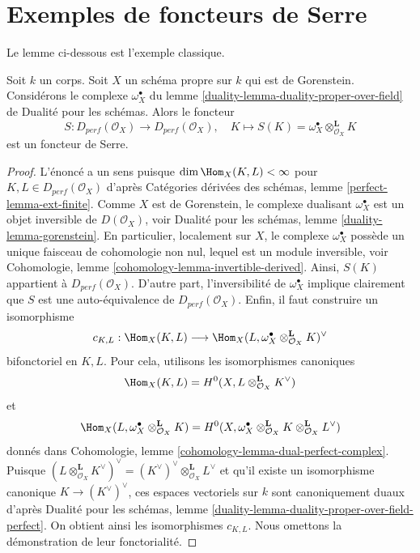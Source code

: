 \section{Exemples de foncteurs de Serre}
\label{section-examples-Serre-functors}

\noindent
Le lemme ci-dessous est l'exemple classique.

\begin{lemma}
\label{lemma-Serre-functor-Gorenstein-proper}
Soit $k$ un corps. Soit $X$ un schéma propre sur $k$ qui est de Gorenstein.
Considérons le complexe $\omega_X^\bullet$ du
lemme \ref{duality-lemma-duality-proper-over-field} de Dualité pour les schémas.
Alors le foncteur
$$
S : D_{perf}(\mathcal{O}_X) \longrightarrow D_{perf}(\mathcal{O}_X),\quad
K \longmapsto S(K) = \omega_X^\bullet \otimes_{\mathcal{O}_X}^\mathbf{L} K
$$
est un foncteur de Serre.
\end{lemma}

\begin{proof}
L'énoncé a un sens puisque $\dim \Hom_X(K, L) < \infty$
pour $K, L \in D_{perf}(\mathcal{O}_X)$ d'après
Catégories dérivées des schémas, lemme \ref{perfect-lemma-ext-finite}.
Comme $X$ est de Gorenstein, le complexe dualisant $\omega_X^\bullet$
est un objet inversible de $D(\mathcal{O}_X)$, voir
Dualité pour les schémas, lemme \ref{duality-lemma-gorenstein}.
En particulier, localement sur $X$, le complexe $\omega_X^\bullet$
possède un unique faisceau de cohomologie non nul, lequel est un module inversible, voir
Cohomologie, lemme \ref{cohomology-lemma-invertible-derived}.
Ainsi, $S(K)$ appartient à $D_{perf}(\mathcal{O}_X)$.
D'autre part, l'inversibilité de $\omega_X^\bullet$
implique clairement que $S$ est une auto-équivalence de $D_{perf}(\mathcal{O}_X)$.
Enfin, il faut construire un isomorphisme
$$
c_{K, L} : \Hom_X(K, L) \longrightarrow
\Hom_X(L, \omega_X^\bullet \otimes_{\mathcal{O}_X}^\mathbf{L} K)^\vee
$$
bifonctoriel en $K, L$. Pour cela, utilisons les isomorphismes canoniques
$$
\Hom_X(K, L) = H^0(X, L \otimes_{\mathcal{O}_X}^\mathbf{L} K^\vee)
$$
et
$$
\Hom_X(L, \omega_X^\bullet \otimes_{\mathcal{O}_X}^\mathbf{L} K) =
H^0(X, 
\omega_X^\bullet \otimes_{\mathcal{O}_X}^\mathbf{L} K
\otimes_{\mathcal{O}_X}^\mathbf{L} L^\vee)
$$
donnés dans Cohomologie, lemme \ref{cohomology-lemma-dual-perfect-complex}.
Puisque $(L \otimes_{\mathcal{O}_X}^\mathbf{L} K^\vee)^\vee =
(K^\vee)^\vee \otimes_{\mathcal{O}_X}^\mathbf{L} L^\vee$
et qu'il existe un isomorphisme canonique $K \to (K^\vee)^\vee$,
ces espaces vectoriels sur $k$ sont canoniquement duaux d'après
Dualité pour les schémas, lemme
\ref{duality-lemma-duality-proper-over-field-perfect}.
On obtient ainsi les isomorphismes $c_{K, L}$.
Nous omettons la démonstration de leur fonctorialité.
\end{proof}





